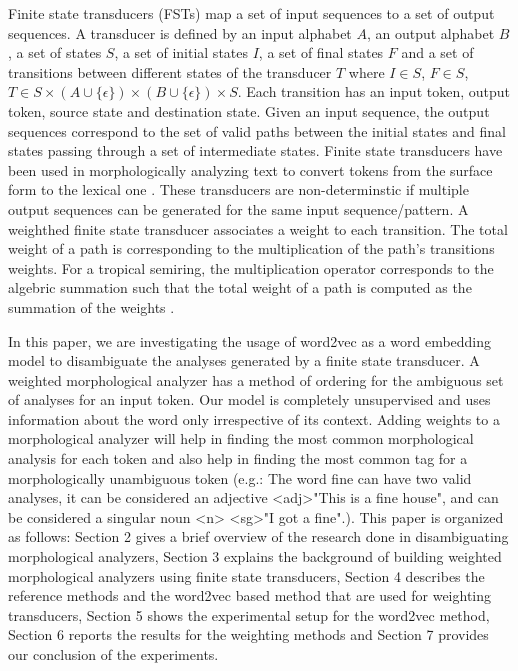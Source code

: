 \documentclass[free]{flammie}
\begin{document}
Finite state transducers (FSTs) map a set of input sequences to a set of output
sequences. A transducer is defined by an input alphabet \(A\), an output
alphabet \(B\) , a set of states \(S\), a set of initial states \(I\), a set of
final states \(F\) and a set of transitions between different states of the
transducer \(T\) where \(I \in S\), \(F \in S\), \(T \in S \times (A \cup
\{\epsilon\}) \times (B \cup \{\epsilon\}) \times S\). Each transition has an
input token, output token, source state and destination state. Given an input
sequence, the output sequences correspond to the set of valid paths between the
initial states and final states passing through a set of intermediate states.
Finite state transducers have been used in morphologically analyzing text to
convert tokens from the surface form to the lexical one
\cite{beesley2003computational}. These transducers are non-determinstic if
multiple output sequences can be generated for the same input sequence/pattern.
A weighthed finite state transducer associates a weight to each transition. The
total weight of a path is corresponding to the multiplication of the path's
transitions weights. For a tropical semiring, the multiplication operator
corresponds to the algebric summation such that the total weight of a path is
computed as the summation of the weights \cite{mohri2004weighted}.

In this paper, we are investigating the usage of word2vec as a word embedding
model to disambiguate the analyses generated by a finite state transducer. A
weighted morphological analyzer has a method of ordering for the ambiguous set
of analyses for an input token. Our model is completely unsupervised and uses
information about the word only irrespective of its context. Adding weights to a
morphological analyzer will help in finding the most common morphological
analysis for each token and also help in finding the most common tag for a
morphologically unambiguous token (e.g.: The word fine can have two valid
analyses, it can be considered an adjective \textless adj\textgreater "This is a
fine house", and can be considered a singular noun \textless n\textgreater
\textless sg\textgreater "I got a fine".).
This paper is organized as follows: Section 2 gives a brief overview of the
research done in disambiguating morphological analyzers, Section 3 explains the
background of building weighted morphological analyzers using finite state
transducers, Section 4 describes the reference methods and the word2vec based
method that are used for weighting transducers, Section 5 shows the experimental
setup for the word2vec method, Section 6 reports the results for the weighting
methods and Section 7 provides our conclusion of the experiments.
\end{document}
